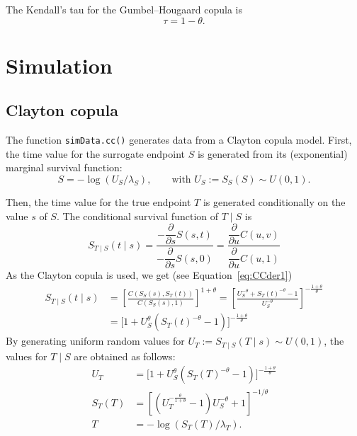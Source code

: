 \documentclass{article}
\begin{document}
The Kendall's tau for the Gumbel--Hougaard copula is
\begin{equation}
    \tau = 1 - \theta.
\end{equation}


\section*{Simulation}
\subsection*{Clayton copula}
The function \texttt{simData.cc()} generates data from a Clayton copula model.
First, the time value for the surrogate endpoint $S$ is generated
  from its (exponential) marginal survival function:
  \begin{equation}
    S = -\log(U_S / \lambda_S), \qquad\text{with }
      U_S := S_S(S) \sim U(0,1).
  \end{equation}

Then, the time value for the true endpoint $T$ is generated conditionally
  on the value $s$ of $S$.
The conditional survival function of $T\mid S$ is
  \begin{equation}
    S_{T\mid S}(t\mid s) 
    = \frac{
        - \dfrac{\partial}{\partial s} S(s, t)
      }{
        - \dfrac{\partial}{\partial s} S(s, 0)
      }
      = \frac{
        \dfrac{\partial}{\partial u} C(u, v)
      }{
        \dfrac{\partial}{\partial u} C(u, 1)
      }
  \end{equation}
As the Clayton copula is used, we get (see Equation~\ref{eq:CCder1})
  \begin{align}
    \nonumber
    S_{T\mid S}(t\mid s) 
    &= \left[\frac{
        C(S_S(s), S_T(t))
      }{
        C(S_S(s), 1)
      }\right]^{1 + \theta}
    = \left[\frac{
        U_S^{-\theta} + S_T(t)^{-\theta} - 1
      }{
        U_S^{-\theta}
      }\right]^{-\frac{1 + \theta}\theta}\\
    &= \Big[1 + 
        U_S^\theta (S_T(t)^{-\theta} - 1)
        \Big]^{-\frac{1 + \theta}\theta}
  \end{align}
By generating uniform random values for 
  $U_T := S_{T\mid S}(T\mid s)\sim U(0,1)$,
  the values for $T\mid S$ are obtained as follows:
  \begin{align}
    \nonumber
    U_T &= \Big[1 + 
      U_S^\theta (S_T(T)^{-\theta} - 1)
      \Big]^{-\frac{1 + \theta}\theta}
    \\ \nonumber
    S_T(T) &= \left[
      \left(U_T^{-\frac\theta{1+\theta}} - 1\right) U_S^{-\theta} + 1
      \right]^{-1 / \theta}
    \\ 
    T &= -\log(S_T(T) / \lambda_T).
  \end{align}
\end{document}
